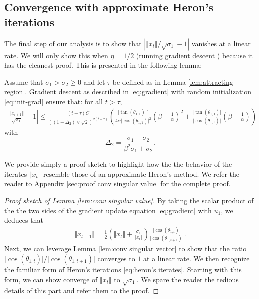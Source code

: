 \subsection{Convergence with approximate Heron's iterations}

The final step of our analysis is to show that $\left\vert \Vert x_{t}\Vert / \sqrt{\sigma_1} - 1\right\vert$ vanishes at a linear rate. We will only show this when $\eta=1/2$ (running gradient descent \cite{eq:gradient}) because it has the cleanest proof. This is presented in the following lemma:
\begin{lemma}\label{lem:conv singular value} 
 Assume that $\sigma_1 > \sigma_2 \ge 0$ and let $\tau$ be defined as in Lemma \ref{lem:attracting region}. Gradient descent as described in \eqref{eq:gradient} with random initialization \eqref{eq:init-grad} ensure that: for all $t > \tau$, 
\begin{align}
    \left\vert \frac{\Vert x_{t+1} \Vert}{\sqrt{\sigma_1}} - 1 \right\vert \le \frac{  (t - \tau) C}{\left((1 + \Delta_2)\vee \sqrt{2}\right)^{2(t - \tau)}} \left(  \frac{\vert \tan(\theta_{1,1})\vert^2}{4\alpha \vert \cos(\theta_{1,1})\vert^2} \left(\beta + \frac{1}{\alpha}\right)^2 + \frac{\vert \tan(\theta_{1,1})\vert}{\vert \cos(\theta_{1,1})\vert}\left(\beta + \frac{1}{\alpha}\right) \right)
\end{align}
with 
$$
\Delta_2 = \frac{\sigma_1 - \sigma_2}{\beta^2 \sigma_1 + \sigma_2}.
$$  



\end{lemma}
 We provide simply a proof sketch to highlight how the the behavior of the iterates $\Vert x_t \Vert$ resemble those of an approximate Heron's method. We refer the reader to  Appendix \ref{sec:proof conv singular value} for the complete proof.

\begin{proof}[Proof sketch of Lemma \ref{lem:conv singular value}]
     By taking the scalar product of the the two sides of the gradient update equation \eqref{eq:gradient} with $u_1$, we deduces that   
\begin{align}\label{eq:1}
    \Vert x_{t+1} \Vert = \frac{1}{2}\left(\Vert x_t \Vert + \frac{\sigma_1}{\Vert x_t \Vert} \right) \frac{\vert \cos(\theta_{1, t})\vert}{ \vert \cos(\theta_{1, t+1})\vert }.
\end{align}
Next, we can leverage Lemma \ref{lem:conv singular vector} to show that the ratio $ \vert \cos(\theta_{1, t})\vert /  \vert \cos(\theta_{1, t+1})\vert  $ converges to $1$ at a linear rate. We then recognize the familiar form of Heron's iterations \ref{eq:heron's iterates}. Starting with this form, we can show converge of $\Vert x_t \Vert$ to $\sqrt{\sigma_1}$. We spare the reader the tedious details of this part and refer them to the proof.
\end{proof}


